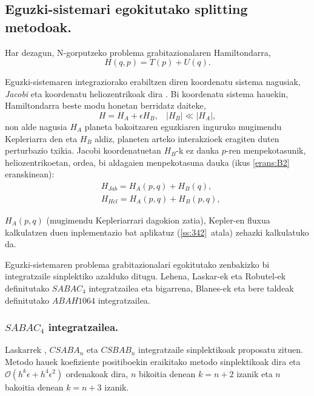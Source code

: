 \subsection{Eguzki-sistemari egokitutako splitting metodoak.}

Har dezagun, N-gorputzeko problema grabitazionalaren Hamiltondarra,
\begin{equation*}
H(q,p)=T(p)+U(q).
\end{equation*}

Eguzki-sistemaren integraziorako erabiltzen diren koordenatu sistema nagusiak, \emph{Jacobi} eta koordenatu heliozentrikoak dira \cite{Wisdom2006,Farres2013}.  Bi koordenatu sistema hauekin, Hamiltondarra beste modu honetan berridatz daiteke,
\begin{equation*}
H=H_A+\epsilon H_B,  \ \ \ \ |H_B|\ll|H_A|,
\end{equation*}
non alde nagusia $H_A$ planeta bakoitzaren eguzkiaren inguruko mugimendu Kepleriarra den eta $H_B$ aldiz, planeten arteko interakzioek eragiten duten perturbazio txikia. Jacobi koordenatuetan $H_B$-k ez dauka $p$-ren menpekotasunik, heliozentrikoetan, ordea, bi aldagaien menpekotasuna dauka (ikus \ref{erans:B2} eranskinean):
\begin{align*}
&H_{Jab}=H_A(p,q)+H_B(q), \\
&H_{Hel}=H_A(p,q)+H_B(p,q), 
\end{align*}       

$H_A(p,q)$ (mugimendu Kepleriarrari dagokion zatia), Kepler-en fluxua kalkulatzen duen inplementazio bat aplikatuz (\ref{ss:342}~atala) zehazki kalkulatuko da.

Eguzki-sistemaren problema grabitazionalari egokitutako zenbakizko bi integratzaile sinplektiko azalduko ditugu. Lehena, Laskar-ek eta Robutel-ek \cite{Laskar2001} definitutako \emph{$SABAC_4$} integratzailea eta bigarrena, Blanes-ek eta bere taldeak \cite{Blanes2013,Farres2013} definitutako \emph{$ABAH1064$} integratzailea. 


\subsubsection*{$SABAC_4$ integratzailea.}

Laskarrek \cite[$2001$]{Laskar2001}, $CSABA_n$ eta $CSBAB_n$ integratzaile sinplektikoak proposatu zituen. Metodo hauek koefiziente positiboekin eraikitako metodo sinplektikoak dira eta $\mathcal{O}(h^{k} \epsilon+ h^{4} \epsilon^2)$ ordenakoak dira, $n$ bikoitia denean $k=n+2$ izanik eta $n$ bakoitia denean $k=n+3$ izanik. 

